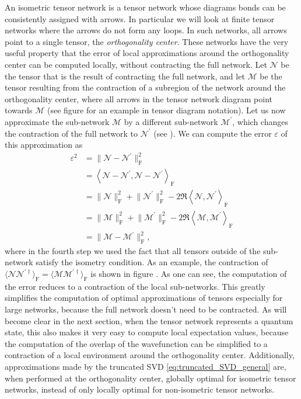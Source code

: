 An isometric tensor network is a tensor network whose diagrams bonds can be consistently assigned with arrows. In particular we will look at finite tensor networks where the arrows do not form any loops. In such networks, all arrows point to a single tensor, the \textit{orthogonality center}. These networks have the very useful property that the error of local approximations around the orthogonality center can be computed locally, without contracting the full network. Let $\mathcal{N}$ be the tensor that is the result of contracting the full network, and let $\mathcal{M}$ be the tensor resulting from the contraction of a subregion of the network around the orthogonality center, where all arrows in the tensor network diagram point towards $\mathcal{M}$ (see figure  for an example in tensor diagram notation). Let us now approximate the sub-network $\mathcal{M}$ by a different sub-network $\mathcal{M}^\prime$, which changes the contraction of the full network to $\mathcal{N}^\prime$ (see ). We can compute the error $\varepsilon$ of this approximation as
\begin{equation}
\begin{split}
	\varepsilon^2 &= \lVert\mathcal{N}-\mathcal{N}^\prime\rVert^2_\text{F} \\
	&=
	\left\langle\mathcal{N}-\mathcal{N}^\prime, \mathcal{N}-\mathcal{N}^\prime\right\rangle_\text{F} \\
	&= \lVert\mathcal{N}\rVert_\text{F}^2 + \lVert\mathcal{N}^\prime\rVert_\text{F}^2 - 2\Re\left\langle\mathcal{N},\mathcal{N}^\prime\right\rangle_\text{F} \\
	&= \lVert\mathcal{M}\rVert_\text{F}^2 + \lVert\mathcal{M}^\prime\rVert_\text{F}^2 - 2\Re\left\langle\mathcal{M},\mathcal{M}^\prime\right\rangle_\text{F} \\
	&= \lVert\mathcal{M}-\mathcal{M}^\prime\rVert^2_\text{F},
\end{split}
\end{equation}
where in the fourth step we used the fact that all tensors outside of the sub-network satisfy the isometry condition. As an example, the contraction of $\langle\mathcal{N}\mathcal{N}^{\prime\dagger}\rangle_\text{F} = \langle\mathcal{M}\mathcal{M}^{\prime\dagger}\rangle_\text{F}$ is shown in figure . As one can see, the computation of the error reduces to a contraction of the local sub-networks. This greatly simplifies the computation of optimal approximations of tensors especially for large networks, because the full network doesn't need to be contracted. As will become clear in the next section, when the tensor network represents a quantum state, this also makes it very easy to compute local expectation values, because the computation of the overlap of the wavefunction can be simplified to a contraction of a local environment around the orthogonality center. Additionally, approximations made by the truncated SVD \ref{eq:truncated_SVD_general} are, when performed at the orthogonality center, globally optimal for isometric tensor networks, instead of only locally optimal for non-isometric tensor networks.
